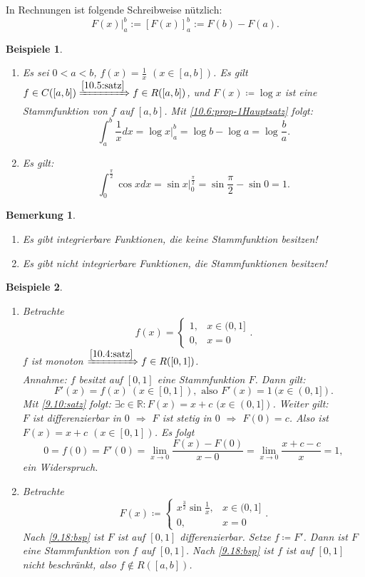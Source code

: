 \documentclass[12pt]{extreport} %
\newcommand{\R}{\mathbb{R}}
\theoremstyle{named}
\theoremstyle{itshape}
\theoremstyle{normal}
\newtheorem*{beispiele}{Beispiele}
\newtheorem*{bemerkung}{Bemerkung}
\begin{document}
{In Rechnungen ist folgende Schreibweise nützlich:
$$F(x) \Big|_{a}^{b} := \left[ F(x) \right]_{a}^{b}:= F(b)-F(a). $$

\begin{beispiele} ~\
	\begin{enumerate}
		\item Es sei $0 < a < b$, $f(x) = \frac{1}{x}$ $(x \in [a,b])$. Es gilt $f \in C([a, b]) \xRightarrow[]{\ref{10.5:satz}} f \in R([a, b])$, und
		$F(x) \coloneqq \log x$ ist eine Stammfunktion von $f$ auf $[a, b]$. Mit \ref{10.6:prop-1Hauptsatz} folgt:
			$$ \int_{a}^{b} \frac{1}{x} dx = \log x \Big|_{a}^{b} = \log b - \log a =\log \frac{b}{a}. $$
		\item  Es gilt: $$\int_{0}^{\frac{\pi}{2}} \cos x dx = \sin x \Big|_{0}^{\frac{\pi}{2}}= \sin \frac{\pi}{2} - \sin 0 = 1.$$
	\end{enumerate}
\end{beispiele}

\begin{bemerkung} ~\
\begin{enumerate}
	\item Es gibt integrierbare Funktionen, die keine Stammfunktion besitzen!
	\item Es gibt nicht integrierbare Funktionen, die Stammfunktionen besitzen!
\end{enumerate}
\end{bemerkung}

\begin{beispiele} ~\
	\begin{enumerate}
		\item Betrachte $$f(x) = \begin{cases} 1, & x \in (0, 1] \\ 0, & x = 0 \end{cases}.$$ 
			$f$ ist monoton $\xRightarrow[]{\ref{10.4:satz}} f \in R([0, 1])$. \\
			Annahme: $f$ besitzt auf $[0, 1]$ eine Stammfunktion $F$. Dann gilt:
			$$ F'(x) = f(x) ~ (x \in [0, 1]), \text{ also } F'(x) = 1  ~ (x \in (0, 1]). $$
			Mit \ref{9.10:satz} folgt: $\exists c \in \R: F(x) = x + c$ $(x \in (0, 1])$. Weiter gilt: \\
			$F$ ist differenzierbar in $0$ $\Rightarrow$ $F$ ist stetig in $0$ $\Rightarrow$ $F(0) = c$. Also ist $F(x) = x + c$ $(x \in [0, 1])$. 
			Es folgt
			$$ 0 = f(0) = F'(0) = \lim_{x \rightarrow 0} \frac{F(x) - F(0)}{x - 0} = \lim_{x \rightarrow 0} \frac{x + c - c}{x} = 1, $$
			ein Widerspruch.
		\item Betrachte 
		        $$F(x) \coloneqq \begin{cases} x^{\frac{3}{2}} \sin \frac{1}{x}, & x \in (0, 1] \\ 0, & x = 0 \end{cases}.$$
		        Nach \ref{9.18:bsp} ist $F$ ist auf $[0, 1]$ differenzierbar. Setze $f \coloneqq F'$. Dann ist $F$ eine Stammfunktion von $f$ auf $[0, 1]$.
		        Nach \ref{9.18:bsp} ist $f$ ist auf $[0, 1]$ nicht beschränkt, also $f \notin R([a, b])$. 
	\end{enumerate}	
\end{beispiele}



}
\end{document}
